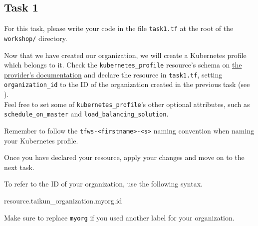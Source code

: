 \subsection{Task 1}\label{sec:task1}

\begin{note}
For this task, please write your code in the file \texttt{task1.tf}
at the root of the \texttt{workshop/} directory.
\end{note}

Now that we have created our organization,
we will create a Kubernetes profile which belongs to it.
Check the \texttt{kubernetes\_profile} resource's schema on
\href{https://intuinewin.github.io/taikun-docs/resources/kubernetes_profile.html}{the provider's documentation}
and declare the resource in \texttt{task1.tf}, setting \texttt{organization\_id} to the ID
of the organization created in the previous task (see ).\\

Feel free to set some of \texttt{kubernetes\_profile}'s other optional attributes,
such as \texttt{schedule\_on\_master} and \texttt{load\_balancing\_solution}.

\begin{warn}
  Remember to follow the \texttt{tfws-<firstname>-<s>} naming convention when naming your Kubernetes profile.
\end{warn}

Once you have declared your resource, apply your changes and move on to the next task.

\begin{tip}
To refer to the ID of your organization, use the following syntax.
\begin{tf}
resource.taikun_organization.myorg.id
\end{tf}
Make sure to replace \texttt{myorg} if you used another label for your organization.
\end{tip}

